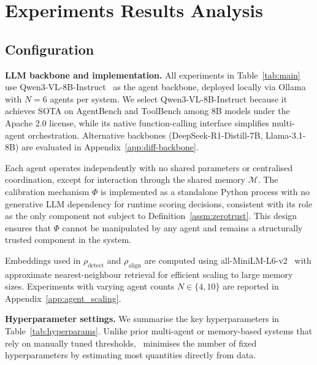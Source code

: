\section{Experiments Results Analysis}
\label{app:expt}

\subsection{Configuration}
\label{app:configuration}

\textbf{LLM backbone and implementation.}
All experiments in Table~\ref{tab:main} use
Qwen3-VL-8B-Instruct~\citep{qwen3technicalreport} as the
agent backbone, deployed locally via Ollama with
$N = 6$ agents per system.  We select Qwen3-VL-8B-Instruct because it achieves SOTA on AgentBench and ToolBench among 8B models under the Apache 2.0 license, while its native function-calling interface simplifies multi-agent orchestration.  Alternative
backbones (DeepSeek-R1-Distill-7B, Llama-3.1-8B)
are evaluated in Appendix~\ref{app:diff-backbone}.

Each agent operates independently with no shared
parameters or centralised coordination, except for
interaction through the shared memory $\mathcal{M}$.
The calibration mechanism $\Phi$ is implemented as a
standalone Python process with no generative LLM dependency for runtime scoring decisions,
consistent with its role as the only component not
subject to Definition~\ref{assm:zerotrust}.  This
design ensures that $\Phi$ cannot be manipulated by
any agent and remains a structurally trusted
component in the system.

Embeddings used in $\rho_{\text{detect}}$ and
$\rho_{\text{align}}$ are computed using
all-MiniLM-L6-v2~\citep{wang2020minilm} with
approximate nearest-neighbour retrieval for efficient
scaling to large memory sizes.  Experiments with
varying agent counts $N \in \{4, 10\}$ are reported
in Appendix~\ref{app:agent_scaling}.

\medskip
\textbf{Hyperparameter settings.}
We summarise the key hyperparameters in
Table~\ref{tab:hyperparams}.  Unlike prior
multi-agent or memory-based systems that rely on
manually tuned thresholds, \system\ minimises the
number of fixed hyperparameters by estimating most
quantities directly from data.

